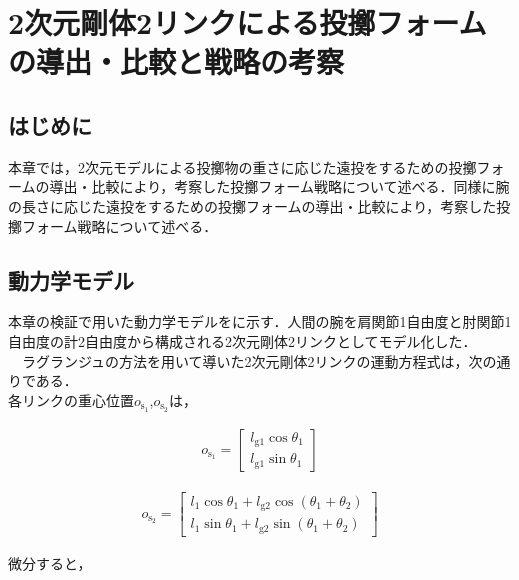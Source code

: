 \chapter[2次元剛体2リンクによる投擲フォームの導出・比較と戦略の考察]{2次元剛体2リンクによる投擲フォームの導出・比較と戦略の考察}

\section{はじめに}
本章では，2次元モデルによる投擲物の重さに応じた遠投をするための投擲フォームの導出・比較により，考察した投擲フォーム戦略について述べる．同様に腕の長さに応じた遠投をするための投擲フォームの導出・比較により，考察した投擲フォーム戦略について述べる．
\section{動力学モデル}
本章の検証で用いた動力学モデルをに示す．人間の腕を肩関節1自由度と肘関節1自由度の計2自由度から構成される2次元剛体2リンクとしてモデル化した．\\
　ラグランジュの方法を用いて導いた2次元剛体2リンクの運動方程式は，次の通りである．\\

\clearpage
各リンクの重心位置$o_{\mathrm{s_{1}}}$,$o_{\mathrm{s_{2}}}$は，

\begin{eqnarray}
  o_{\mathrm{s_{1}}} = 
              \begin{bmatrix}
              l_{\mathrm{g1}}\cos\theta_{1}\\
              l_{\mathrm{g1}}\sin\theta_{1}
              \end{bmatrix}
\end{eqnarray}

\begin{eqnarray}
  o_{\mathrm{s_{2}}} = 
              \begin{bmatrix}
              l_{1}\cos\theta_{1} + l_{\mathrm{g2}}\cos(\theta_{1} + \theta_{2})\\
              l_{1}\sin\theta_{1} + l_{\mathrm{g2}}\sin(\theta_{1} + \theta_{2})
              \end{bmatrix}
\end{eqnarray}

微分すると，

